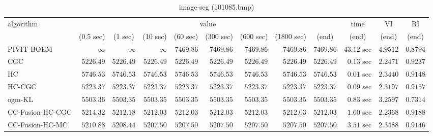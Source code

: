 \begin{table}[H]
\scriptsize
\centering
\caption{image-seg (101085.bmp)}
\label{tab:anytimetable-image-seg-101085.bmp}
\begin{tabular}{lrrrrrrrrrrr}
\toprule
           algorithm &                                   \multicolumn{8}{c}{value} & \multicolumn{1}{c}{time}    & \multicolumn{1}{c}{VI}  & \multicolumn{1}{c}{RI} \\  
\cmidrule(lr){2-9}\cmidrule(lr){10-10} \cmidrule(lr){11-11} \cmidrule(lr){12-12}   
                     & \multicolumn{1}{c}{(0.5 sec)} & \multicolumn{1}{c}{(1 sec)} & \multicolumn{1}{c}{(10 sec)} & \multicolumn{1}{c}{(60 sec)} & \multicolumn{1}{c}{(300 sec)} & \multicolumn{1}{c}{(600 sec)} & \multicolumn{1}{c}{(1800 sec)} & \multicolumn{1}{c}{(end)} & \multicolumn{1}{c}{(end)}    & \multicolumn{1}{c}{(end)}   & \multicolumn{1}{c}{(end)}  \\ \midrule 
          PIVIT-BOEM & $\infty$ & $\infty$ & $\infty$ & $      7469.86$ & $      7469.86$ & $      7469.86$ & $      7469.86$ & $      7469.86$ & $        43.12$ sec    & $       4.9512$  & $       0.8794$ \\ 
                 CGC & $      5226.49$ & $      5226.49$ & $      5226.49$ & $      5226.49$ & $      5226.49$ & $      5226.49$ & $      5226.49$ & $      5226.49$ & $         0.13$ sec    & $       2.2471$  & $       0.9237$ \\ 
                  HC & $      5746.53$ & $      5746.53$ & $      5746.53$ & $      5746.53$ & $      5746.53$ & $      5746.53$ & $      5746.53$ & $      5746.53$ & $         0.01$ sec    & $       2.3440$  & $       0.9148$ \\ 
              HC-CGC & $      5223.37$ & $      5223.37$ & $      5223.37$ & $      5223.37$ & $      5223.37$ & $      5223.37$ & $      5223.37$ & $      5223.37$ & $         0.09$ sec    & $       2.3197$  & $       0.9157$ \\ 
              ogm-KL & $      5503.36$ & $      5503.35$ & $      5503.35$ & $      5503.35$ & $      5503.35$ & $      5503.35$ & $      5503.35$ & $      5503.35$ & $         0.83$ sec    & $       3.2597$  & $       0.7314$ \\ 
    CC-Fusion-HC-CGC & $      5214.32$ & $      5212.18$ & $      5212.03$ & $      5212.03$ & $      5212.03$ & $      5212.03$ & $      5212.03$ & $      5212.03$ & $         1.60$ sec    & $       2.2368$  & $       0.9188$ \\ 
     CC-Fusion-HC-MC & $      5210.88$ & $      5208.44$ & $      5207.50$ & $      5207.50$ & $      5207.50$ & $      5207.50$ & $      5207.50$ & $      5207.50$ & $         3.51$ sec    & $       2.3488$  & $       0.9146$ \\ 

\end{tabular}
\end{table}
